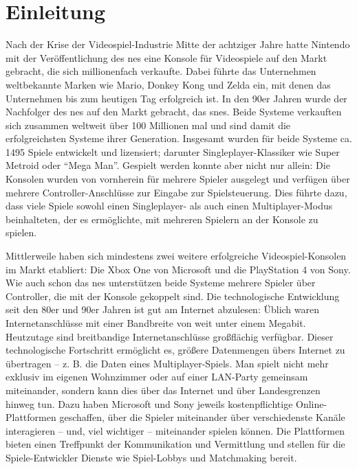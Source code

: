 
\chapter{Einleitung}\label{einleitung}

Nach der Krise der Videospiel-Industrie Mitte der achtziger Jahre hatte
Nintendo mit der Veröffentlichung des \gls{nes} eine Konsole für
Videospiele auf den Markt gebracht, die sich millionenfach verkaufte.
Dabei führte das Unternehmen weltbekannte Marken wie Mario, Donkey Kong
und Zelda ein, mit denen das Unternehmen bis zum heutigen Tag
erfolgreich ist. In den 90er Jahren wurde der Nachfolger des \gls{nes}
auf den Markt gebracht, das \gls{snes}. Beide Systeme verkauften sich
zusammen weltweit über 100 Millionen mal und sind damit die
erfolgreichsten Systeme ihrer Generation. Insgesamt wurden für beide
Systeme ca. 1495 Spiele entwickelt und lizensiert; darunter
Singleplayer-Klassiker wie Super Metroid oder \enquote{Mega Man}.
Gespielt werden konnte aber nicht nur allein: Die Konsolen wurden von
vornherein für mehrere Spieler ausgelegt und verfügen über mehrere
Controller-Anschlüsse zur Eingabe zur Spielsteuerung. Dies führte dazu,
dass viele Spiele sowohl einen Singleplayer- als auch einen
Multiplayer-Modus beinhalteten, der es ermöglichte, mit mehreren
Spielern an der Konsole zu spielen.

Mittlerweile haben sich mindestens zwei weitere erfolgreiche
Videospiel-Konsolen im Markt etabliert: Die Xbox One von Microsoft und
die PlayStation 4 von Sony. Wie auch schon das \gls{nes} unterstützen
beide Systeme mehrere Spieler über Controller, die mit der Konsole
gekoppelt sind. Die technologische Entwicklung seit den 80er und 90er
Jahren ist gut am Internet abzulesen: Üblich waren Internetanschlüsse
mit einer Bandbreite von weit unter einem Megabit.
Heutzutage sind breitbandige
Internetanschlüsse großflächig verfügbar. Dieser technologische
Fortschritt ermöglicht es, größere Datenmengen übers Internet zu
übertragen -- z. B. die Daten eines Multiplayer-Spiels. Man spielt nicht
mehr exklusiv im eigenen Wohnzimmer oder auf einer LAN-Party gemeinsam
miteinander, sondern kann dies über das Internet und über Landesgrenzen
hinweg tun. Dazu haben Microsoft und Sony jeweils kostenpflichtige
Online-Plattformen geschaffen, über die Spieler miteinander über
verschiedenste Kanäle interagieren -- und, viel wichtiger -- miteinander
spielen können. Die Plattformen bieten einen Treffpunkt der
Kommunikation und Vermittlung und stellen für die Spiele-Entwickler
Dienste wie Spiel-Lobbys und Matchmaking bereit.

